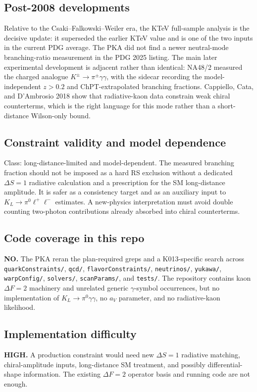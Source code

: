 \subsection*{Post-2008 developments}
Relative to the Csaki--Falkowski--Weiler era, the KTeV full-sample analysis is
the decisive update: it superseded the earlier KTeV value and is one of the two
inputs in the current PDG average.  The PKA did not find a newer neutral-mode
branching-ratio measurement in the PDG 2025 listing.  The main later
experimental development is adjacent rather than identical: NA48/2 measured the
charged analogue \(K^\pm\to\pi^\pm\gamma\gamma\), with the sidecar recording
the model-independent \(z>0.2\) and ChPT-extrapolated branching fractions.
Cappiello, Cata, and D'Ambrosio 2018 show that radiative-kaon data constrain
weak chiral counterterms, which is the right language for this mode rather than
a short-distance Wilson-only bound.

\subsection*{Constraint validity and model dependence}
Class: long-distance-limited and model-dependent.  The measured branching
fraction should not be imposed as a hard RS exclusion without a dedicated
\(\Delta S=1\) radiative calculation and a prescription for the SM
long-distance amplitude.  It is safer as a consistency target and as an
auxiliary input to \(K_L\to\pi^0\ell^+\ell^-\) estimates.  A new-physics
interpretation must avoid double counting two-photon contributions already
absorbed into chiral counterterms.

\subsection*{Code coverage in this repo}
\textbf{NO.}  The PKA reran the plan-required greps and a K013-specific search
across \texttt{quarkConstraints/}, \texttt{qcd/}, \texttt{flavorConstraints/},
\texttt{neutrinos/}, \texttt{yukawa/}, \texttt{warpConfig/},
\texttt{solvers/}, \texttt{scanParams/}, and \texttt{tests/}.  The repository
contains kaon \(\Delta F=2\) machinery and unrelated generic \(\gamma\)-symbol
occurrences, but no implementation of \(K_L\to\pi^0\gamma\gamma\), no \(a_V\)
parameter, and no radiative-kaon likelihood.

\subsection*{Implementation difficulty}
\textbf{HIGH.}  A production constraint would need new \(\Delta S=1\)
radiative matching, chiral-amplitude inputs, long-distance SM treatment, and
possibly differential-shape information.  The existing \(\Delta F=2\) operator
basis and running code are not enough.

